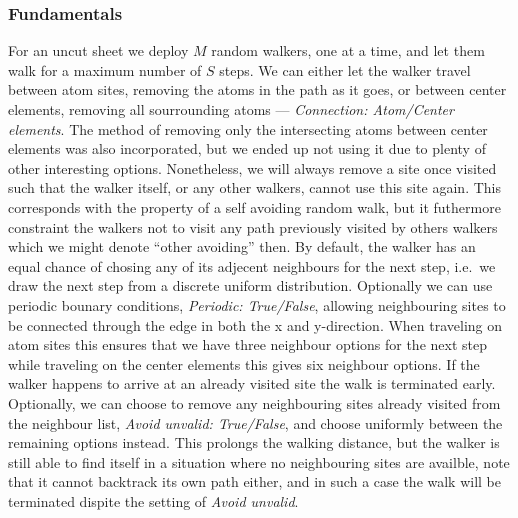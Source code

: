 \subsubsection{Fundamentals} %
For an uncut sheet we deploy $M$ random walkers, one at a time, and let them walk
for a maximum number of $S$ steps. We can either let the walker travel between
atom sites, removing the atoms in the path as it goes, or between center
elements, removing all sourrounding atoms --- \textit{Connection: Atom/Center
elements}. The method of removing only the intersecting atoms between center elements was also incorporated, but we ended up not using it due to plenty of other interesting options. Nonetheless, we will always remove a site once visited such that the
walker itself, or any other walkers, cannot use this site again. This corresponds
with the property of a self avoiding random walk, but it futhermore constraint
the walkers not to visit any path previously visited by others walkers which we might denote ``other avoiding'' then. By default, the walker has an equal chance of chosing any of its adjecent
neighbours for the next step, i.e.\ we draw the next step from a discrete
uniform distribution. Optionally we can use periodic bounary conditions,
\textit{Periodic: True/False}, allowing neighbouring sites to be connected
through the edge in both the x and y-direction. When traveling on atom sites
this ensures that we have three neighbour options for the next step while traveling on the
center elements this gives six neighbour options. If the walker happens to arrive at
an already visited site the walk is terminated early. Optionally, we can choose
to remove any neighbouring sites already visited from the neighbour list,
\textit{Avoid unvalid: True/False}, and choose uniformly between the remaining
options instead. This prolongs the walking distance, but the walker is
still able to find itself in a situation where no neighbouring sites are
availble, note that it cannot backtrack its own path either, and in such a case
the walk will be terminated dispite the setting of \textit{Avoid unvalid}.


